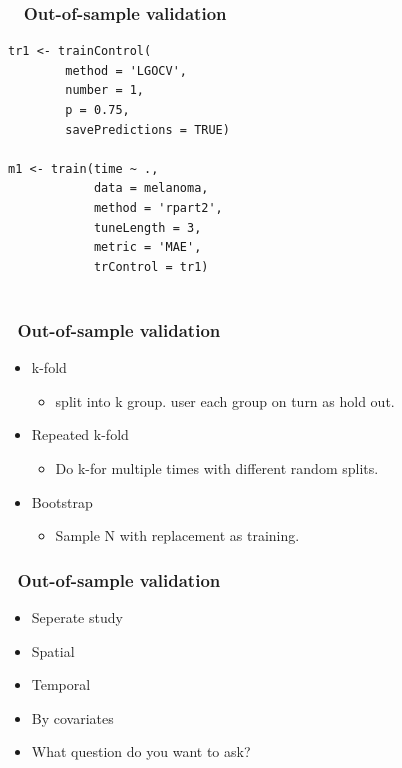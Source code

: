 \documentclass[handout, aspectratio = 169]{beamer}
\begin{document}
\begin{frame}[fragile]
\frametitle{\insertframenumber~ Out-of-sample validation}
\renewcommand{\FancyVerbFormatLine}[1]{%
   \ifnum\value{FancyVerbLine}=2\color{cyan}#1%
   \else #1\fi}
\begin{Verbatim}
tr1 <- trainControl(
        method = 'LGOCV',
        number = 1,
        p = 0.75,
        savePredictions = TRUE)

m1 <- train(time ~ ., 
            data = melanoma,
            method = 'rpart2',
            tuneLength = 3,
            metric = 'MAE',
            trControl = tr1)
            
\end{Verbatim}

\end{frame} 



\begin{frame}
\frametitle{\insertframenumber~Out-of-sample validation}

\begin{itemize}
\item k-fold
\begin{itemize}
\item split into k group. user each group on turn as hold out.
\end{itemize}
\item Repeated k-fold
\begin{itemize}
\item Do k-for multiple times with different random splits.
\end{itemize}
\item Bootstrap
\begin{itemize}
\item Sample N with replacement as training.
\end{itemize}
\end{itemize}
\end{frame} 

\begin{frame}
\frametitle{\insertframenumber~Out-of-sample validation}

\begin{itemize}
\item Seperate study
\item Spatial
\item Temporal
\item By covariates
\item What question do you want to ask?
\end{itemize}
\end{frame} 
\end{document}
